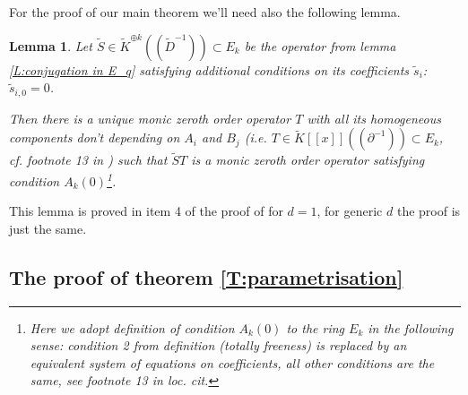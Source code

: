 \documentclass[11pt]{article}
\theoremstyle{definition}
\theoremstyle{plain}
\newtheorem{lemma}{Lemma}[section]
\numberwithin{equation}{section}
\begin{document}
For the proof of our main theorem we'll need also the following lemma.
\begin{lemma}
\label{L:T=SS}
Let $\tilde{S}\in \tilde{K}^{\oplus k}((\tilde{D}^{-1}))\subset E_k$ be the operator from lemma \ref{L:conjugation in E_q} satisfying additional conditions on its coefficients $\tilde{s}_i$: 
$\tilde{s}_{i,0}=0$. 

Then there is a unique monic zeroth order operator $T$ with all its homogeneous components don't depending on $A_i$ and $B_j$ (i.e. $T\in \tilde{K}[[x]]((\partial^{-1}))\subset E_k$, cf. footnote 13 in \cite{Zheglov25}) such that $\tilde{S}T$ is a monic zeroth order operator satisfying condition $A_k(0)$\footnote{Here we adopt definition of condition $A_k(0)$ to the ring $E_k$ in the following sense: condition 2 from definition (totally freeness) is replaced by an equivalent system of equations \cite[(2.3)]{Zheglov25} on coefficients, all other conditions are the same, see footnote 13 in loc. cit.}. 
\end{lemma}

This lemma is proved in item 4 of the proof of \cite[Th. 5.2]{Zheglov25} for $d=1$, for generic $d$ the proof is just the same.


\subsection{The proof of theorem \ref{T:parametrisation}}
\end{document}
